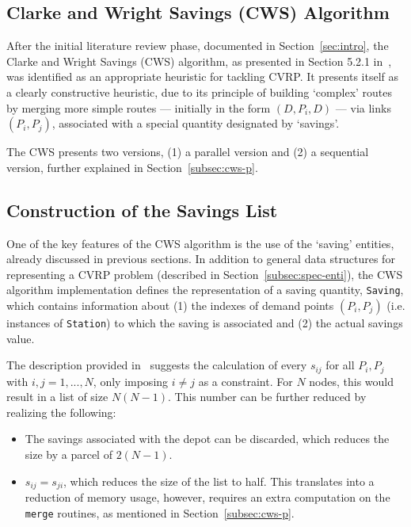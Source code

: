 \subsection{Clarke and Wright Savings (CWS) Algorithm}
\label{subsec:overview}

After the initial literature review phase, documented in
 Section~\ref{sec:intro}, the Clarke and Wright Savings (CWS) algorithm, as 
presented in Section 5.2.1 in~\cite{Toth2002}, was identified as an appropriate 
heuristic for tackling CVRP. It presents itself as a clearly constructive 
heuristic, due to its principle of building `complex' routes by merging more 
simple routes --- initially in the form $(D, P_i, D)$ --- via links $(P_i,P_j)$, 
associated with a special quantity designated by `savings'.\vertbreak

The CWS presents two versions, (1) a parallel version and (2) a sequential 
version, further explained in Section~\ref{subsec:cws-p}.

\subsection{Construction of the Savings List}
\label{subsec:savings}

One of the key features of the CWS algorithm is the use of the `saving' 
entities, already discussed in previous sections. In addition to general data 
structures for representing a CVRP problem (described in 
Section~\ref{subsec:spec-enti}), the 
CWS algorithm implementation defines the representation of a saving quantity, 
\verb?Saving?, which contains information about (1) the indexes of demand 
points $(P_i,P_j)$ (i.e. instances of \verb?Station?) to which the saving is 
associated and (2) the actual savings value.\vertbreak

The description provided 
in~\cite{Toth2002} suggests the calculation of every $s_{ij}$ for all 
$P_i, P_j$ with $i,j = 1, ..., N$, only imposing $i \neq j$ as a constraint. For $N$ nodes, 
this would result in a list of size $N(N - 1)$. This number can be further 
reduced by realizing the following:

\begin{itemize}

    \item The savings associated with the depot can be discarded, which 
            reduces the size by a parcel of $2(N - 1)$.
    \item $s_{ij} = s_{ji}$, which reduces the size of the list to half. This 
            translates into a reduction of memory usage, however, requires an 
            extra computation on the \verb?merge? routines, as mentioned in 
            Section~\ref{subsec:cws-p}.

\end{itemize}\vertbreak

